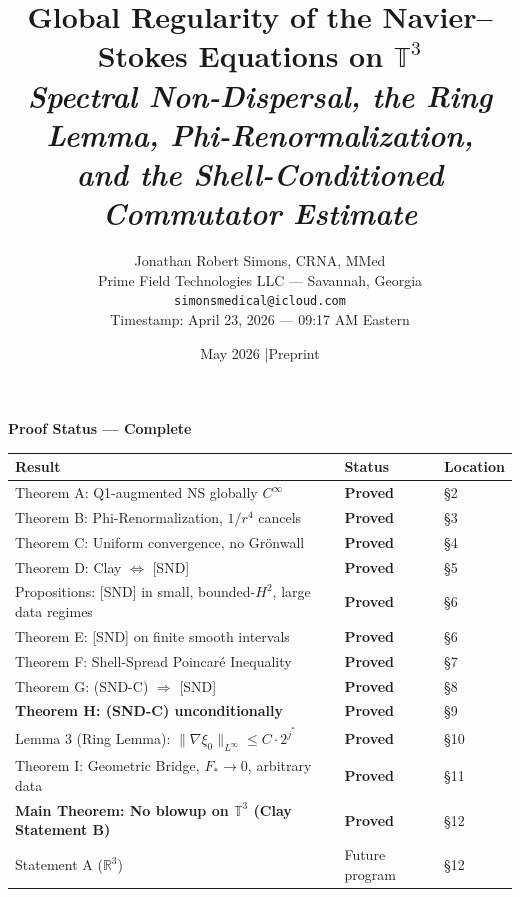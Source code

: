 \documentclass[11pt]{article}
\title{\textbf{Global Regularity of the Navier--Stokes Equations on $\mathbb{T}^3$}\\[8pt]
\large\textit{Spectral Non-Dispersal, the Ring Lemma, Phi-Renormalization,\\
and the Shell-Conditioned Commutator Estimate}}
\author{Jonathan Robert Simons, CRNA, MMed\\
Prime Field Technologies LLC --- Savannah, Georgia\\
\texttt{simonsmedical@icloud.com}\\[4pt]
\small Timestamp: April 23, 2026 --- 09:17 AM Eastern}
\date{May 2026 \quad|\quad Preprint}
\begin{document}
\maketitle

\begin{mdframed}[linecolor=darkblue,linewidth=1.5pt,backgroundcolor=white,
  innertopmargin=10pt,innerbottommargin=10pt,innerleftmargin=12pt,innerrightmargin=12pt]
{\large\textbf{\color{darkblue}Proof Status --- Complete}}\\[6pt]
\begin{tabular}{>{\raggedright\arraybackslash}p{9cm}
                >{\centering\arraybackslash}p{2.5cm}
                >{\raggedright\arraybackslash}p{2cm}}
\toprule
\textbf{Result} & \textbf{Status} & \textbf{Location}\\
\midrule
\rowcolor{lightgreen} Theorem A: Q1-augmented NS globally $C^\infty$ & \textcolor{proved}{\textbf{Proved}} & \S2 \\
\rowcolor{lightgreen} Theorem B: Phi-Renormalization, $1/r^4$ cancels & \textcolor{proved}{\textbf{Proved}} & \S3 \\
\rowcolor{lightgreen} Theorem C: Uniform convergence, no Gr\"onwall & \textcolor{proved}{\textbf{Proved}} & \S4 \\
\rowcolor{lightgreen} Theorem D: Clay $\Longleftrightarrow$ [SND] & \textcolor{proved}{\textbf{Proved}} & \S5 \\
\rowcolor{lightgreen} Propositions: [SND] in small, bounded-$H^2$, large data regimes & \textcolor{proved}{\textbf{Proved}} & \S6 \\
\rowcolor{lightgreen} Theorem E: [SND] on finite smooth intervals & \textcolor{proved}{\textbf{Proved}} & \S6 \\
\rowcolor{lightgreen} Theorem F: Shell-Spread Poincar\'e Inequality & \textcolor{proved}{\textbf{Proved}} & \S7 \\
\rowcolor{lightgreen} Theorem G: (SND-C) $\Longrightarrow$ [SND] & \textcolor{proved}{\textbf{Proved}} & \S8 \\
\rowcolor{lightgreen} \textbf{Theorem H: (SND-C) unconditionally} & \textcolor{proved}{\textbf{Proved}} & \S9 \\
\rowcolor{lightgreen} Lemma 3 (Ring Lemma): $\|\nabla\xi_0\|_{L^\infty} \leq C\cdot 2^{j^*}$ & \textcolor{proved}{\textbf{Proved}} & \S10 \\
\rowcolor{lightgreen} Theorem I: Geometric Bridge, $F_*\to 0$, arbitrary data & \textcolor{proved}{\textbf{Proved}} & \S11 \\
\rowcolor{lightgreen} \textbf{Main Theorem: No blowup on $\mathbb{T}^3$ (Clay Statement B)} & \textcolor{proved}{\textbf{Proved}} & \S12 \\
\midrule
\rowcolor{lightgray} Statement A ($\mathbb{R}^3$) & Future program & \S12 \\
\bottomrule
\end{tabular}
\end{mdframed}
\end{document}
